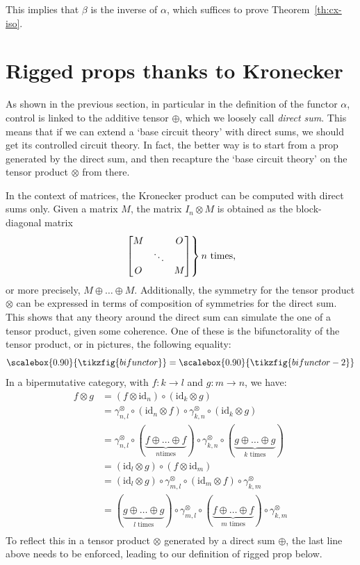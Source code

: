 \documentclass[a4paper]{article}
\theoremstyle{plain}
\theoremstyle{definition}
\newcommand{\tf}[1]{\scalebox{0.90}{\tikzfig{#1}}}
\newcommand{\symtimes}{\gamma^\otimes}
\newcommand{\iid}{\mathrm{id}}
\begin{document}
This implies that $\beta$ is the inverse of $\alpha$, which
suffices to prove Theorem~\ref{th:cx-iso}.

\section{Rigged props thanks to Kronecker}
\label{sec:rig}

As shown in the previous section, in particular in the definition of the
functor $\alpha$, control is linked to the additive tensor $\oplus$, which we
loosely call \emph{direct sum}. This means that if we can extend a `base
circuit theory' with direct sums, we should get its controlled
circuit theory. In fact, the better way is to start from a prop generated by
the direct sum, and then recapture the `base circuit theory' on the tensor
product $\otimes$ from there.

In the context of matrices, the Kronecker product can be computed with direct
sums only. Given a matrix $M$, the matrix $I_n \otimes M$ is obtained as the
block-diagonal matrix
\[
	\left.
		\begin{bmatrix}
			M && O \\
			& \ddots & \\
			O && M
		\end{bmatrix}
	\right\}
	n\text{ times}\text,
\]
or more precisely, $M \oplus \dots \oplus M$. Additionally, the
symmetry for the tensor product $\otimes$ can be expressed in terms of composition
of symmetries for the direct sum. This shows that any theory around the direct
sum can simulate the one of a tensor product, given some coherence. One of
these is the bifunctorality of the tensor product, or in pictures, the
following equality:
\[
	\tf{bifunctor}
	=
	\tf{bifunctor-2}
\]
In a bipermutative category, with $f \colon k \to l$ and $g \colon m \to
n$, we have:
\[
	\begin{array}{ll}
		f \otimes g
		&= (f \otimes \iid_n) \circ (\iid_k \otimes g) \\[.8ex]
		&= \symtimes_{n,l} \circ (\iid_n \otimes f) \circ \symtimes_{k,n} \circ (\iid_k \otimes g) \\[.8ex]
		&= \symtimes_{n,l} \circ (\underbrace{f \oplus \dots \oplus f}_{n\text{
			times}}) \circ \symtimes_{k,n} \circ (\underbrace{g \oplus \dots \oplus
		g}_{k\text{ times}}) \\[2.5ex]
		&= (\iid_l \otimes g) \circ (f \otimes \iid_m) \\[.8ex]
		&= (\iid_l \otimes g) \circ \symtimes_{m,l} \circ (\iid_m \otimes f) \circ \symtimes_{k,m} \\[.8ex]
		&= (\underbrace{g \oplus \dots \oplus g}_{l\text{ times}}) \circ
		\symtimes_{m,l} \circ (\underbrace{f \oplus \dots \oplus f}_{m\text{ times}})
		\circ \symtimes_{k,m} \\[.8ex]
	\end{array}
\]
To reflect this in a tensor product $\otimes$ generated by a direct sum
$\oplus$, the last line above needs to be enforced, leading to our definition of
rigged prop below.
\end{document}
